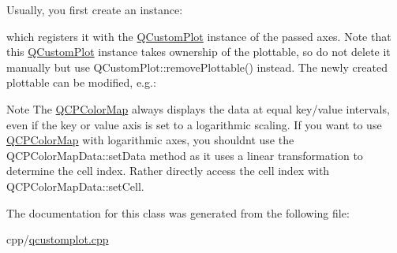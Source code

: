 Usually, you first create an instance\+: 
\begin{DoxyCodeInclude}
\end{DoxyCodeInclude}
which registers it with the \mbox{\hyperlink{class_q_custom_plot}{Q\+Custom\+Plot}} instance of the passed axes. Note that this \mbox{\hyperlink{class_q_custom_plot}{Q\+Custom\+Plot}} instance takes ownership of the plottable, so do not delete it manually but use Q\+Custom\+Plot\+::remove\+Plottable() instead. The newly created plottable can be modified, e.\+g.\+: 
\begin{DoxyCodeInclude}
\end{DoxyCodeInclude}
 \begin{DoxyNote}{Note}
The \mbox{\hyperlink{class_q_c_p_color_map}{Q\+C\+P\+Color\+Map}} always displays the data at equal key/value intervals, even if the key or value axis is set to a logarithmic scaling. If you want to use \mbox{\hyperlink{class_q_c_p_color_map}{Q\+C\+P\+Color\+Map}} with logarithmic axes, you shouldn\textquotesingle{}t use the Q\+C\+P\+Color\+Map\+Data\+::set\+Data method as it uses a linear transformation to determine the cell index. Rather directly access the cell index with Q\+C\+P\+Color\+Map\+Data\+::set\+Cell. 
\end{DoxyNote}


The documentation for this class was generated from the following file\+:\begin{DoxyCompactItemize}
\item 
cpp/\mbox{\hyperlink{qcustomplot_8cpp}{qcustomplot.\+cpp}}\end{DoxyCompactItemize}
